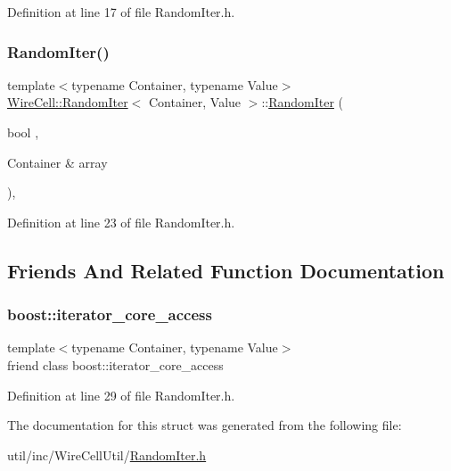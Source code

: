 Definition at line 17 of file Random\+Iter.\+h.

\mbox{\label{struct_wire_cell_1_1_random_iter_ad4ddcd5508b01ca78b971762a6375627}} 
\subsubsection{\texorpdfstring{Random\+Iter()}{RandomIter()}\hspace{0.1cm}{\footnotesize\ttfamily [2/2]}}
{\footnotesize\ttfamily template$<$typename Container, typename Value$>$ \\
\hyperlink{struct_wire_cell_1_1_random_iter}{Wire\+Cell\+::\+Random\+Iter}$<$ Container, Value $>$\+::\hyperlink{struct_wire_cell_1_1_random_iter}{Random\+Iter} (\begin{DoxyParamCaption}\item[{bool}]{,  }\item[{Container \&}]{array }\end{DoxyParamCaption})\hspace{0.3cm}{\ttfamily [inline]}, {\ttfamily [explicit]}}



Definition at line 23 of file Random\+Iter.\+h.



\subsection{Friends And Related Function Documentation}
\mbox{\label{struct_wire_cell_1_1_random_iter_ac09f73e325921cc50ebcd96bed0f8096}} 
\subsubsection{\texorpdfstring{boost\+::iterator\+\_\+core\+\_\+access}{boost::iterator\_core\_access}}
{\footnotesize\ttfamily template$<$typename Container, typename Value$>$ \\
friend class boost\+::iterator\+\_\+core\+\_\+access\hspace{0.3cm}{\ttfamily [friend]}}



Definition at line 29 of file Random\+Iter.\+h.



The documentation for this struct was generated from the following file\+:\begin{DoxyCompactItemize}
\item 
util/inc/\+Wire\+Cell\+Util/\hyperlink{_random_iter_8h}{Random\+Iter.\+h}\end{DoxyCompactItemize}
